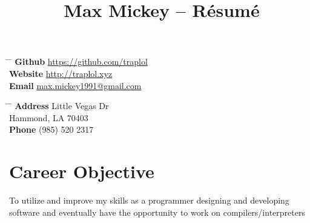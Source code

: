 \documentclass[10pt]{article} %
\begin{document}
\raggedright


\title{Max Mickey -- Résumé}


\parbox{0.5\textwidth}{ %
\begin{tabbing}
\hspace{2cm} \= \hspace{3cm} \= \kill 
\textbf {Github} \> \href{https://github.com/traplol}{https://github.com/traplol} \\
\textbf {Website} \> \href{http://traplol.xyz}{http://traplol.xyz} \\
\textbf {Email} \> \href{mailto:max.mickey1991@gmail.com}{max.mickey1991@gmail.com} \\
\end{tabbing}}
\hfill
\parbox{0.5\textwidth}{ %
\begin{tabbing}
\hspace{2cm} \= \hspace{3cm} \= \kill
\textbf {Address}  Little Vegas Dr\\ %
\> Hammond, LA 70403 \\ %
\textbf {Phone} \> (985) 520 2317 \\
\end{tabbing}}

\vspace{-10mm}
\section{Career Objective}
\vspace{-3mm}

To utilize and improve my skills as a programmer designing and developing
software and eventually have the opportunity to work on compilers/interpreters

\end{document}
